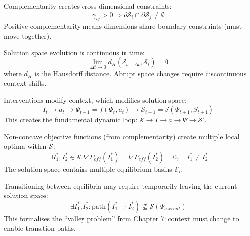 \begin{axiom}
Complementarity creates cross-dimensional constraints:
\begin{equation}
\gamma_{ij} > 0 \Rightarrow \partial \mathcal{S}_i \cap \partial \mathcal{S}_j \neq \emptyset
\end{equation}
Positive complementarity means dimensions share boundary constraints (must move together).
\end{axiom}

\begin{axiom}
Solution space evolution is continuous in time:
\begin{equation}
\lim_{\Delta t \to 0} d_H(\mathcal{S}_{t+\Delta t}, \mathcal{S}_t) = 0
\end{equation}
where $d_H$ is the Hausdorff distance. Abrupt space changes require discontinuous context shifts.
\end{axiom}

\begin{axiom}
Interventions modify context, which modifies solution space:
\begin{equation}
I_t \to a_t \to \Psi_{t+1} = f(\Psi_t, a_t) \to \mathcal{S}_{t+1} = \mathcal{S}(\Psi_{t+1}, S_{t+1})
\end{equation}
This creates the fundamental dynamic loop: $\mathcal{S} \to I \to a \to \Psi \to \mathcal{S}'$.
\end{axiom}

\begin{axiom}
Non-concave objective functions (from complementarity) create multiple local optima within $\mathcal{S}$:
\begin{equation}
\exists I^*_1, I^*_2 \in \mathcal{S}: \nabla P_{eff}(I^*_1) = \nabla P_{eff}(I^*_2) = 0, \quad I^*_1 \neq I^*_2
\end{equation}
The solution space contains multiple equilibrium basins $\mathcal{E}_i$.
\end{axiom}

\begin{axiom}
Transitioning between equilibria may require temporarily leaving the current solution space:
\begin{equation}
\exists I^*_1, I^*_2: \text{path}(I^*_1 \to I^*_2) \not\subseteq \mathcal{S}(\Psi_{current})
\end{equation}
This formalizes the ``valley problem'' from Chapter 7: context must change to enable transition paths.
\end{axiom}

